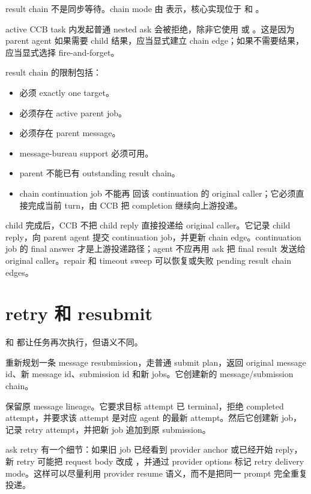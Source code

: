 result chain 不是同步等待。chain mode 由  表示，核心实现位于  和 。

active CCB task 内发起普通 nested ask 会被拒绝，除非它使用  或 。这是因为 parent agent 如果需要 child 结果，应当显式建立 chain edge；如果不需要结果，应当显式选择 fire-and-forget。

result chain 的限制包括：

\begin{itemize}
  \item 必须 exactly one target。
  \item 必须存在 active parent job。
  \item 必须存在 parent message。
  \item message-bureau support 必须可用。
  \item parent 不能已有 outstanding result chain。
  \item chain continuation job 不能再  回该 continuation 的 original caller；它必须直接完成当前 turn，由 CCB 把 completion 继续向上游投递。
\end{itemize}

child 完成后，CCB 不把 child reply 直接投递给 original caller。它记录 child reply，向 parent agent 提交 continuation job，并更新 chain edge。continuation job 的 final answer 才是上游投递路径；agent 不应再用 ask 把 final result 发送给 original caller。repair 和 timeout sweep 可以恢复或失败 pending result chain edges。

\section{retry 和 resubmit}

 和  都让任务再次执行，但语义不同。

 重新规划一条 message resubmission，走普通 submit plan，返回 original message id、新 message id、submission id 和新 jobs。它创建新的 message/submission chain。

 保留原 message lineage。它要求目标 attempt 已 terminal，拒绝 completed attempt，并要求该 attempt 是对应 agent 的最新 attempt。然后它创建新 job，记录 retry attempt，并把新 job 追加到原 submission。

ask retry 有一个细节：如果旧 job 已经看到 provider anchor 或已经开始 reply，新 retry 可能把 request body 改成 ，并通过 provider options 标记 retry delivery mode。这样可以尽量利用 provider resume 语义，而不是把同一 prompt 完全重复投递。

